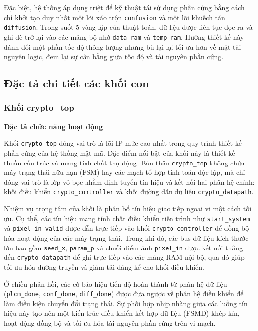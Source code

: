 Đặc biệt, hệ thống áp dụng triệt để kỹ thuật tái sử dụng phần cứng bằng cách chỉ khởi tạo duy nhất một lõi xáo trộn \texttt{confusion} và một lõi khuếch tán \texttt{diffusion}. Trong suốt 5 vòng lặp của thuật toán, dữ liệu được liên tục đọc ra và ghi đè trở lại vào các mảng bộ nhớ \texttt{data\_ram} và \texttt{temp\_ram}. Hướng thiết kế này đánh đổi một phần tốc độ thông lượng nhưng bù lại lại tối ưu hơn về mặt tài nguyên logic, đem lại sự cân bằng giữa tốc độ và tài nguyên phần cứng.

\subsection{Đặc tả chi tiết các khối con}
\subsubsection{Khối crypto\_top}
\textbf{Đặc tả chức năng hoạt động} 

Khối \texttt{crypto\_top} đóng vai trò là lõi IP mức cao nhất trong quy trình thiết kế phần cứng của hệ thống mật mã. Đặc điểm nổi bật của khối này là thiết kế thuần cấu trúc và mang tính chất thụ động. Bản thân \texttt{crypto\_top} không chứa máy trạng thái hữu hạn (FSM) hay các mạch tổ hợp tính toán độc lập, mà chỉ đóng vai trò là lớp vỏ bọc nhằm định tuyến tín hiệu và kết nối hai phân hệ chính: khối điều khiển \texttt{crypto\_controller} và khối đường dẫn dữ liệu \texttt{crypto\_datapath}.

Nhiệm vụ trọng tâm của khối là phân bổ tín hiệu giao tiếp ngoại vi một cách tối ưu. Cụ thể, các tín hiệu mang tính chất điều khiển tiến trình như \texttt{start\_system} và \texttt{pixel\_in\_valid} được dẫn trực tiếp vào khối \texttt{crypto\_controller} để đồng bộ hóa hoạt động của các máy trạng thái. Trong khi đó, các bus dữ liệu kích thước lớn bao gồm \texttt{seed\_x}, \texttt{param\_p} và chuỗi điểm ảnh \texttt{pixel\_in} được kết nối thẳng đến \texttt{crypto\_datapath} để ghi trực tiếp vào các mảng RAM nội bộ, qua đó giúp tối ưu hóa đường truyền và giảm tải đáng kể cho khối điều khiển.

Ở chiều phản hồi, các cờ báo hiệu tiến độ hoàn thành từ phân hệ dữ liệu (\texttt{plcm\_done}, \texttt{conf\_done}, \texttt{diff\_done}) được đưa ngược về phân hệ điều khiển để làm điều kiện chuyển đổi trạng thái. Sự phối hợp nhịp nhàng giữa các luồng tín hiệu này tạo nên một kiến trúc điều khiển kết hợp dữ liệu (FSMD) khép kín, hoạt động đồng bộ và tối ưu hóa tài nguyên phần cứng trên vi mạch.

